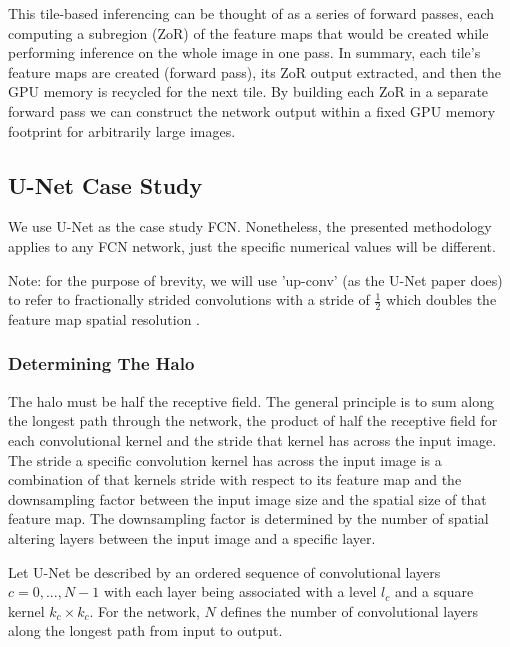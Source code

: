 \documentclass[runningheads]{llncs}
\begin{document}
This tile-based inferencing can be thought of as a series of forward passes, each computing a subregion (ZoR) of the feature maps that would be created while performing inference on the whole image in one pass. 
In summary, each tile's feature maps are created (forward pass), its ZoR output extracted, and then the GPU memory is recycled for the next tile. By building each ZoR in a separate forward pass we can construct the network output within a fixed GPU memory footprint for arbitrarily large images. 




\subsection{U-Net Case Study}

We use U-Net \cite{Ronneberger2015a} as the case study FCN. Nonetheless, the presented methodology applies to any FCN network, just the specific numerical values will be different. 

Note: for the purpose of brevity, we will use 'up-conv' (as the U-Net paper does) to refer to fractionally strided convolutions with a stride of $\frac{1}{2}$ which doubles the feature map spatial resolution \cite{Dumoulin2018}.

\subsubsection{Determining The Halo}

The halo must be half the receptive field. 
The general principle is to sum along the longest path through the network, the product of half the receptive field for each convolutional kernel and the stride that kernel has across the input image. The stride a specific convolution kernel has across the input image is a combination of that kernels stride with respect to its feature map and the downsampling factor between the input image size and the spatial size of that feature map. The downsampling factor is determined by the number of spatial altering layers between the input image and a specific layer. 

Let U-Net be described by an ordered sequence of convolutional layers $c={0, ..., N-1}$ with each layer being associated with a level $l_{c}$ and a square kernel $k_{c} \times k_{c}$. 
For the network, $N$ defines the number of convolutional layers along the longest path from input to output. 
\end{document}
